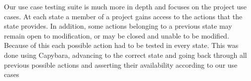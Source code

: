 \documentclass[document.tex]{subfiles}
\begin{document}
Our use case testing suite is much more in depth and focuses on the project use cases. At each state a member of a project gains access to the actions that the state provides. In addition, some actions belonging to a previous state may remain open to modification, or may be closed and unable to be modified. Because of this each possible action had to be tested in every state. This was done using Capybara, advancing to the correct state and going back through all previous possible actions and asserting their availability according to our use cases
\end{document}
